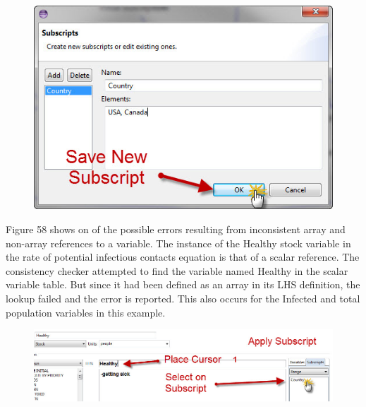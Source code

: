 \documentclass[11pt]{amsart}
\begin{document}
\begin{figure}[ht]
\begin{center}
\vspace{.2in}
\centerline {
\includegraphics[totalheight=0.3\textheight]{images/055.jpg}
}
\caption{}
\label{fig:055}
\end{center}
\end{figure}


Figure 58 shows on of the possible errors resulting from inconsistent array and non-array references to a variable. The instance of the Healthy stock variable in the rate of potential infectious contacts equation is that of a scalar reference. The consistency checker attempted to find the variable named Healthy in the scalar variable table. But since it had been defined as an array in its LHS definition, the lookup failed and the error is reported. This also occurs for the Infected and total population variables in this example.

\begin{figure}[ht]
\begin{center}
\vspace{.2in}
\centerline {
\includegraphics[totalheight=0.15\textheight]{images/056.jpg}
}
\caption{}
\label{fig:056}
\end{center}
\end{figure}
\end{document}
